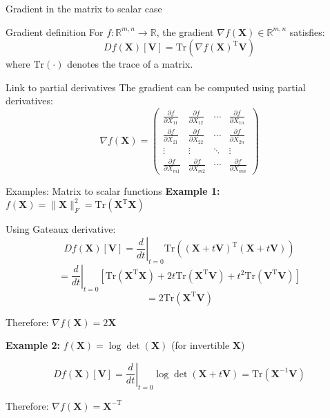 \documentclass[aspectratio=1610]{beamer}
\begin{document}
\begin{frame}{Gradient in the matrix to scalar case}
  \begin{block}{Gradient definition}
    For $f:\mathbb{R}^{m,n} \to \mathbb{R}$, the gradient $\nabla f(\mathbf{X}) \in \mathbb{R}^{m,n}$ satisfies:
    $$Df(\mathbf{X})[\mathbf{V}] = \mathrm{Tr}(\nabla f(\mathbf{X})^\mathrm{T} \mathbf{V})$$
    where $\mathrm{Tr}(\cdot)$ denotes the trace of a matrix.
  \end{block}
  
  \begin{block}{Link to partial derivatives}
    The gradient can be computed using partial derivatives:
    $$\nabla f(\mathbf{X}) = \begin{pmatrix}
      \frac{\partial f}{\partial X_{11}} & \frac{\partial f}{\partial X_{12}} & \cdots & \frac{\partial f}{\partial X_{1n}} \\
      \frac{\partial f}{\partial X_{21}} & \frac{\partial f}{\partial X_{22}} & \cdots & \frac{\partial f}{\partial X_{2n}} \\
      \vdots & \vdots & \ddots & \vdots \\
      \frac{\partial f}{\partial X_{m1}} & \frac{\partial f}{\partial X_{m2}} & \cdots & \frac{\partial f}{\partial X_{mn}}
    \end{pmatrix}$$
  \end{block}
\end{frame}

\begin{frame}{Examples: Matrix to scalar functions}
  \textbf{Example 1:} $f(\mathbf{X}) = \|\mathbf{X}\|_F^2 = \mathrm{Tr}(\mathbf{X}^\mathrm{T}\mathbf{X})$
  
  Using Gateaux derivative:
  $$Df(\mathbf{X})[\mathbf{V}] = \left.\frac{d}{dt}\right|_{t=0} \mathrm{Tr}((\mathbf{X}+t\mathbf{V})^\mathrm{T}(\mathbf{X}+t\mathbf{V}))$$
  $$= \left.\frac{d}{dt}\right|_{t=0} [\mathrm{Tr}(\mathbf{X}^\mathrm{T}\mathbf{X}) + 2t\mathrm{Tr}(\mathbf{X}^\mathrm{T}\mathbf{V}) + t^2\mathrm{Tr}(\mathbf{V}^\mathrm{T}\mathbf{V})]$$
  $$= 2\mathrm{Tr}(\mathbf{X}^\mathrm{T}\mathbf{V})$$
  
  Therefore: $\boxed{\nabla f(\mathbf{X}) = 2\mathbf{X}}$
  
  \vspace{10pt}
  
  \textbf{Example 2:} $f(\mathbf{X}) = \log\det(\mathbf{X})$ (for invertible $\mathbf{X}$)
  
  $$Df(\mathbf{X})[\mathbf{V}] = \left.\frac{d}{dt}\right|_{t=0} \log\det(\mathbf{X}+t\mathbf{V}) = \mathrm{Tr}(\mathbf{X}^{-1}\mathbf{V})$$
  
  Therefore: $\boxed{\nabla f(\mathbf{X}) = \mathbf{X}^{-\mathrm{T}}}$
\end{frame}
\end{document}
